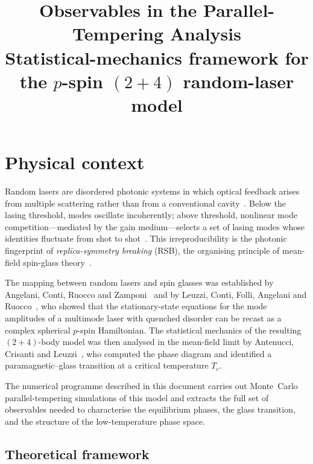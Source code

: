 \documentclass[11pt,a4paper]{article}
\title{%
  Observables in the Parallel-Tempering Analysis \\[4pt]
  \large Statistical-mechanics framework for the
         $p$-spin $(2{+}4)$ random-laser model}
\author{}
\date{}
\begin{document}
\maketitle

\tableofcontents
\newpage

\section{Physical context}\label{sec:context}

Random lasers are disordered photonic systems in which optical
feedback arises from multiple scattering rather than from a
conventional cavity~\cite{Wiersma2008}.  Below the lasing threshold,
modes oscillate incoherently; above threshold, nonlinear
mode competition---mediated by the gain medium---selects a set of
lasing modes whose identities fluctuate from shot to
shot~\cite{Ghofraniha2015}.  This irreproducibility is the photonic
fingerprint of \emph{replica-symmetry breaking} (RSB), the
organising principle of mean-field spin-glass
theory~\cite{MPV1987,Parisi1979,Parisi1983}.

The mapping between random lasers and spin glasses was established by
Angelani, Conti, Ruocco and Zamponi~\cite{Angelani2006} and by
Leuzzi, Conti, Folli, Angelani and Ruocco~\cite{Leuzzi2009}, who
showed that the stationary-state equations for the mode amplitudes
of a multimode laser with quenched disorder can be recast as a
complex spherical $p$-spin Hamiltonian.  The statistical mechanics
of the resulting $(2{+}4)$-body model was then analysed in the
mean-field limit by Antenucci, Crisanti and
Leuzzi~\cite{Antenucci2015a,Antenucci2015b}, who computed the
phase diagram and identified a paramagnetic--glass transition at a
critical temperature $T_c$.

The numerical programme described in this document carries out
Monte~Carlo parallel-tempering simulations of this model and
extracts the full set of observables needed to characterise the
equilibrium phases, the glass transition, and the structure of the
low-temperature phase space.

\subsection{Theoretical framework}
\end{document}
